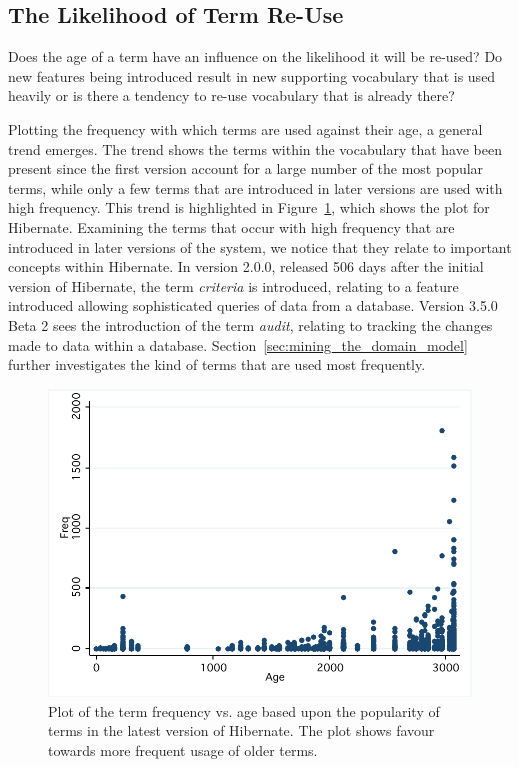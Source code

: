 
\subsection{The Likelihood of Term Re-Use} %
\label{sub:the_likelihood_of_term_re_use}

Does the age of a term have an influence on the likelihood it will be re-used? Do new features being introduced result in new supporting vocabulary that is used heavily or is there a tendency to re-use vocabulary that is already there?

Plotting the frequency with which terms are used against their age, a general trend emerges. The trend shows the terms within the vocabulary that have been present since the first version account for a large number of the most popular terms, while only a few terms that are introduced in later versions are used with high frequency. This trend is highlighted in Figure~\ref{fig:vocab-freqage-hibernate}, which shows the plot for Hibernate. Examining the terms that occur with high frequency that are introduced in later versions of the system, we notice that they relate to important concepts within Hibernate. In version 2.0.0, released 506 days after the initial version of Hibernate, the term \emph{criteria} is introduced, relating to a feature introduced allowing sophisticated queries of data from a database. Version 3.5.0 Beta 2 sees the introduction of the term \emph{audit}, relating to tracking the changes made to data within a database. Section~\ref{sec:mining_the_domain_model} further investigates the kind of terms that are used most frequently.

\begin{figure}[t]
\centering
\includegraphics[width=\textwidth]{Figures/Vocab-HibernateFrequencyAge.pdf}
\caption{Plot of the term frequency vs. age based upon the popularity of terms in the latest version of Hibernate. The plot shows favour towards more frequent usage of older terms.}
\label{fig:vocab-freqage-hibernate}
\end{figure}

